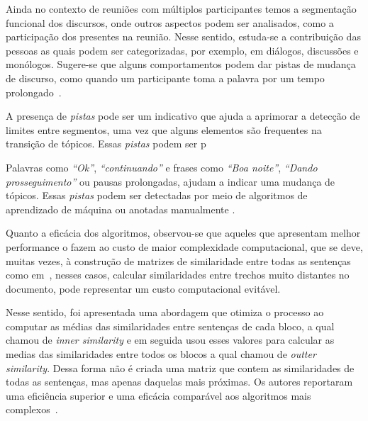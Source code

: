 Ainda no contexto de reuniões com múltiplos participantes temos a segmentação funcional dos discursos, onde outros aspectos podem ser analisados, como a participação dos presentes na reunião. Nesse sentido, estuda-se a contribuição das pessoas as quais podem ser categorizadas,  por exemplo, em diálogos, discussões e monólogos. Sugere-se que alguns comportamentos podem dar pistas de mudança de discurso, como quando um participante toma a palavra por um tempo prolongado~\cite{Bokaei2015}. 



A presença de \textit{pistas} pode ser um indicativo que ajuda a aprimorar a detecção de limites entre segmentos, uma vez que alguns elementos são frequentes na transição de tópicos. 
%
Essas \textit{pistas} podem ser p

Palavras como \textit{``Ok''}, \textit{``continuando''} e frases como \textit{``Boa noite''}, \textit{``Dando prosseguimento''} ou pausas prolongadas, ajudam a indicar uma mudança de tópicos. 
%
Essas \textit{pistas} podem ser detectadas por meio de algoritmos de aprendizado de máquina ou anotadas manualmente
\cite{Hsueh2006} %
\cite{Galley2003} 
\cite{Beeferman1999}.



Quanto a eficácia dos algoritmos, observou-se que aqueles que apresentam melhor performance o fazem ao custo de maior complexidade computacional, que se deve, muitas vezes, à construção de matrizes de similaridade entre todas as sentenças como em~\cite{Choi2000}, nesses casos, calcular similaridades entre trechos muito distantes no documento, pode representar um custo computacional evitável. 

Nesse sentido, foi apresentada uma abordagem que otimiza o processo ao computar as médias das similaridades entre sentenças de cada bloco, a qual chamou de \textit{inner similarity} e em seguida usou esses valores para calcular as medias das similaridades entre todos os blocos a qual chamou de \textit{outter similarity}. Dessa forma não é criada uma matriz que contem as similaridades de todas as sentenças, mas apenas daquelas mais próximas. Os autores reportaram uma eficiência superior e uma eficácia comparável aos algoritmos mais complexos~\cite{Kern2009}.


